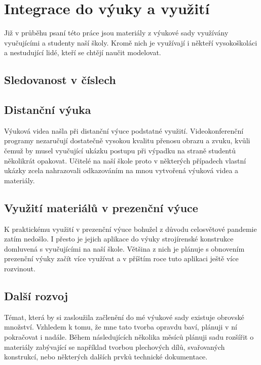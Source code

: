 \chapter{Integrace do výuky a využití}
Již v průběhu psaní této práce jsou materiály z výukové sady využívány vyučujícími a studenty naší školy.
Kromě nich je využívají i někteří vysokoškoláci a nestudující lidé, kteří se chtějí naučit modelovat.

\section{Sledovanost v číslech}
\B{\textcolor{mygreen}{PŠ: Tuto sekci bych rád vztáhnul ke konkrétnímu datu a zmínil konkrétní čísla. Rád bych počkal ještě nějakou chvíli, mezitím by se sledovanost měla přehoupnout přes ty dva tisíce. TZN napíšu nejpozději ve středu večer... }\normalsize}

\section{Distanční výuka}
Výuková videa našla při distanční výuce podstatné využití.
Videokonferenční programy nezaručují dostatečně vysokou kvalitu přenosu obrazu a zvuku, kvůli čemuž by musel vyučující ukázku postupu při výpadku na straně studentů několikrát opakovat.
Učitelé na naší škole proto v některých případech vlastní ukázky zcela nahrazovali odkazováním na mnou vytvořená výuková videa a materiály.

\section{Využití materiálů v prezenční výuce}
K praktickému využití v prezenční výuce bohužel z důvodu celosvětové pandemie zatím nedošlo. 
I přesto je jejich aplikace do výuky strojírenské konstrukce domluvená s vyučujícími na naší škole.
Většina z nich je plánuje s obnovením prezenční výuky začít více využívat a v příštím roce tuto aplikaci ještě více rozvinout.

\section{Další rozvoj}
\B{\textcolor{mygreen}{PŠ: Možná odsunout do závěru?}}\newline
Témat, která by si zasloužila začlenění do mé výukové sady existuje obrovské množství.
Vzhledem k tomu, že mne tato tvorba opravdu baví, plánuji v ní pokračovat i nadále.
Během následujících několika měsíců plánuji sadu rozšířit o materiály zabývající se například tvorbou plechových dílů, svařovaných konstrukcí, nebo některých dalších prvků technické dokumentace.
